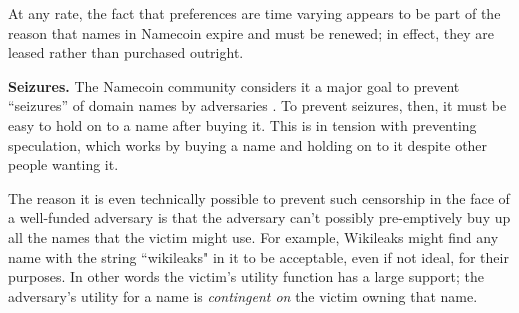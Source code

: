 At any rate, the fact that preferences are time varying appears to be part of the reason that names in Namecoin expire and must be renewed; in effect, they are leased rather than purchased outright.

{\bf Seizures.} The Namecoin community considers it a major goal to prevent ``seizures'' of domain names by adversaries \cite{}. To prevent seizures, then, it must be easy to hold on to a name after buying it. This is in tension with preventing speculation, which works by buying a name and holding on to it despite other people wanting it.

The reason it is even technically possible to prevent such censorship in the face of a well-funded adversary is that the adversary can't possibly pre-emptively buy up all the names that the victim might use. For example, Wikileaks might find any name with the string ``wikileaks" in it to be acceptable, even if not ideal, for their purposes. In other words the victim's utility function has a large support; the adversary's utility for a name is {\em contingent on} the victim owning that name.







